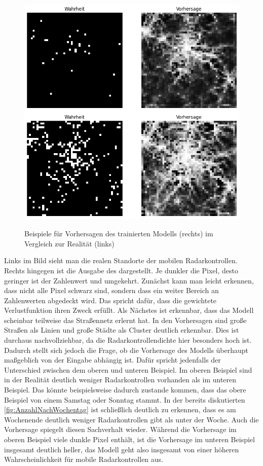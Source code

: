 \begin{figure}[h]
    \centering
    \includegraphics[width=1.0\textwidth,height=12cm,keepaspectratio=true]{content/images/PredExProb.png}
    \caption{Beispiele für Vorhersagen des trainierten Modells (rechts) im Vergleich zur Realität (links)}
    \label{fig:PredExProb}
\end{figure}

Links im Bild sieht man die realen Standorte der mobilen Radarkontrollen.
Rechts hingegen ist die Ausgabe des  dargestellt.
Je dunkler die Pixel, desto geringer ist der Zahlenwert und umgekehrt.
Zunächst kann man leicht erkennen, dass nicht alle Pixel schwarz sind, sondern dass ein weiter Bereich an Zahlenwerten abgedeckt wird.
Das spricht dafür, dass die gewichtete Verlustfunktion ihren Zweck erfüllt.
Als Nächstes ist erkennbar, dass das Modell scheinbar teilweise das Straßennetz erlernt hat.
In den Vorhersagen sind große Straßen als Linien und große Städte als Cluster deutlich erkennbar.
Dies ist durchaus nachvollziehbar, da die Radarkontrollendichte hier besonders hoch ist.
Dadurch stellt sich jedoch die Frage, ob die Vorhersage des Modells überhaupt maßgeblich von der Eingabe abhängig ist.
Dafür spricht jedenfalls der Unterschied zwischen dem oberen und unteren Beispiel.
Im oberen Beispiel sind in der Realität deutlich weniger Radarkontrollen vorhanden als im unteren Beispiel.
Das könnte beispielsweise dadurch zustande kommen, dass das obere Beispiel von einem Samstag oder Sonntag stammt.
In der bereits diskutierten \autoref{fig:AnzahlNachWochentag} ist schließlich deutlich zu erkennen, dass es am Wochenende deutlich weniger Radarkontrollen gibt als unter der Woche.
Auch die Vorhersage spiegelt diesen Sachverhalt wieder.
Während die Vorhersage im oberen Beispiel viele dunkle Pixel enthält, ist die Vorhersage im unteren Beispiel insgesamt deutlich heller, das Modell geht also insgesamt von einer höheren Wahrscheinlichkeit für mobile Radarkontrollen aus.

